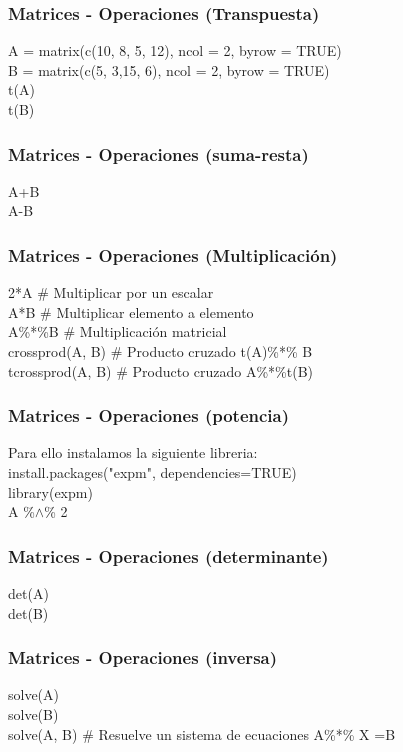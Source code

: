 \documentclass[14pt]{beamer}
\begin{document}
\begin{frame}
	\frametitle{Matrices - Operaciones (Transpuesta)}
	
	A = matrix(c(10, 8, 5, 12), ncol = 2, byrow = TRUE)\\
	B = matrix(c(5, 3,15, 6), ncol = 2, byrow = TRUE)\\
	t(A)\\
	t(B)
\end{frame}

\begin{frame}
	\frametitle{Matrices - Operaciones (suma-resta)}	
	A+B\\
	A-B
\end{frame}

\begin{frame}
	\frametitle{Matrices - Operaciones (Multiplicación)}	
	2*A $\#$ Multiplicar por un escalar\\
	A*B  $\#$ Multiplicar elemento a elemento\\
	A\%*\%B $\#$ Multiplicación matricial \\
	crossprod(A, B)  $\#$ Producto cruzado  t(A)\%*\% B \\
	tcrossprod(A, B) $\#$ Producto cruzado  A\%*\%t(B) \\
\end{frame}

\begin{frame}
	\frametitle{Matrices - Operaciones (potencia)}
	
	Para ello instalamos la siguiente libreria:\\
	install.packages("expm", dependencies=TRUE)\\
	library(expm)\\
	A \%$\wedge$\% 2
	
\end{frame}

\begin{frame}
	\frametitle{Matrices - Operaciones (determinante)}
	
	det(A)\\
	det(B)
	
\end{frame}

\begin{frame}
	\frametitle{Matrices - Operaciones (inversa)}
	
	solve(A)\\
	solve(B)\\
	solve(A, B) $\#$ Resuelve  un sistema de ecuaciones A\%*\% X =B
	
\end{frame}
\end{document}
